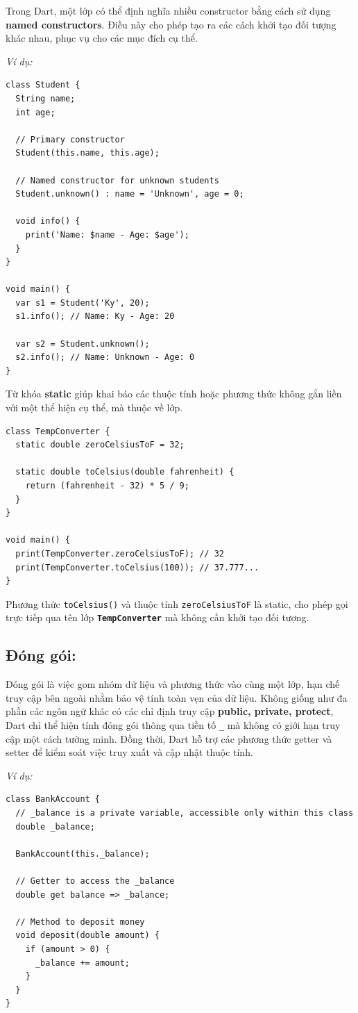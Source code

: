 \documentclass[../DoAn.tex]{subfiles}
\numberwithin{figure}{chapter}
\begin{document}
Trong Dart, một lớp có thể định nghĩa nhiều constructor bằng cách sử dụng \textbf{named constructors}. Điều này cho phép tạo ra các cách khởi tạo đối tượng khác nhau, phục vụ cho các mục đích cụ thể. 

\textit{Ví dụ:}
\begin{lstlisting}
class Student {
  String name;
  int age;

  // Primary constructor
  Student(this.name, this.age);

  // Named constructor for unknown students
  Student.unknown() : name = 'Unknown', age = 0;

  void info() {
    print('Name: $name - Age: $age');
  }
}

void main() {
  var s1 = Student('Ky', 20);
  s1.info(); // Name: Ky - Age: 20

  var s2 = Student.unknown();
  s2.info(); // Name: Unknown - Age: 0
}
\end{lstlisting}

Từ khóa \textbf{static} giúp khai báo các thuộc tính hoặc phương thức không gắn liền với một thể hiện cụ thể, mà thuộc về lớp.

\begin{lstlisting}
class TempConverter {
  static double zeroCelsiusToF = 32;

  static double toCelsius(double fahrenheit) {
    return (fahrenheit - 32) * 5 / 9;
  }
}

void main() {
  print(TempConverter.zeroCelsiusToF); // 32
  print(TempConverter.toCelsius(100)); // 37.777...
}
\end{lstlisting}

Phương thức \texttt{toCelsius()} và thuộc tính \texttt{zeroCelsiusToF}  là static, cho phép gọi trực tiếp qua tên lớp \textbf{\texttt{TempConverter}} mà không cần khởi tạo đối tượng.
\subsection{Đóng gói:} 
Đóng gói là việc gom nhóm dữ liệu và phương thức vào cùng một lớp, hạn chế truy cập bên ngoài nhằm bảo vệ tính toàn vẹn của dữ liệu. Không giống như đa phần các ngôn ngữ khác có các chỉ định truy cập \textbf{public, private, protect}, Dart chỉ thể hiện tính đóng gói thông qua tiền tố \texttt{\_} mà không có giới hạn truy cập một cách tường minh. Đồng thời, Dart hỗ trợ các phương thức getter và setter để kiểm soát việc truy xuất và cập nhật thuộc tính. 

\textit{Ví dụ:}
\begin{lstlisting}
class BankAccount {
  // _balance is a private variable, accessible only within this class
  double _balance;

  BankAccount(this._balance);

  // Getter to access the _balance
  double get balance => _balance;

  // Method to deposit money
  void deposit(double amount) {
    if (amount > 0) {
      _balance += amount;
    }
  }
}
\end{lstlisting}
\end{document}
